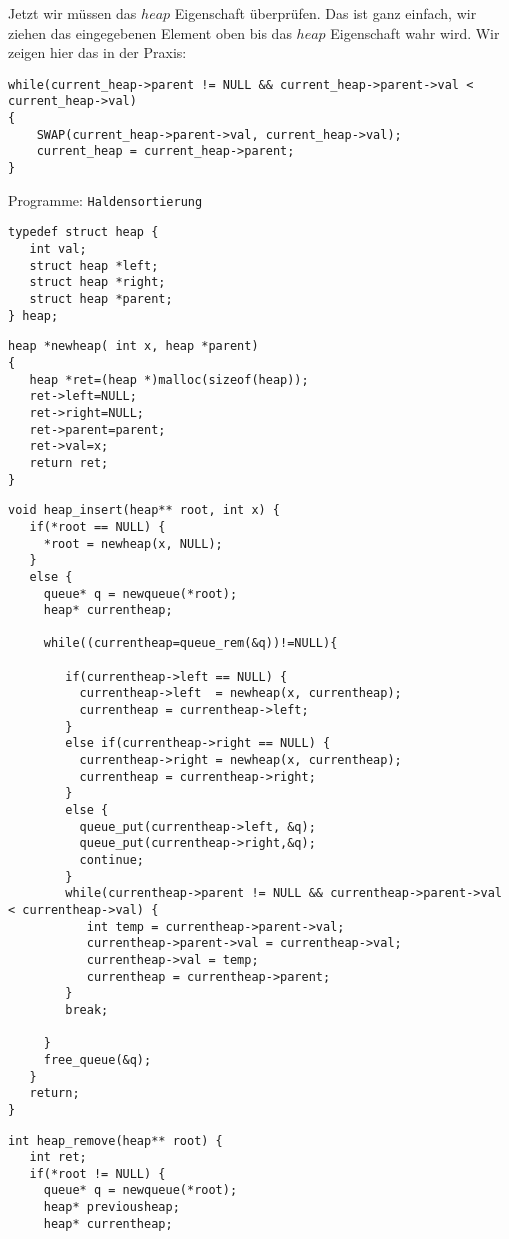 Jetzt wir müssen das $heap$ Eigenschaft überprüfen. Das ist ganz einfach, 
wir ziehen das eingegebenen Element oben bis das $heap$ Eigenschaft wahr wird.
Wir zeigen hier das in der Praxis:
\begin{lstlisting}
while(current_heap->parent != NULL && current_heap->parent->val < current_heap->val) 
{
    SWAP(current_heap->parent->val, current_heap->val);
    current_heap = current_heap->parent;
}
\end{lstlisting} 

\begin{myexampleprogram}{Programme: \texttt{Haldensortierung}}
\begin{lstlisting}
typedef struct heap {
   int val;
   struct heap *left;
   struct heap *right;
   struct heap *parent;
} heap;
\end{lstlisting}
\begin{lstlisting}
heap *newheap( int x, heap *parent)
{
   heap *ret=(heap *)malloc(sizeof(heap));
   ret->left=NULL;
   ret->right=NULL;
   ret->parent=parent;
   ret->val=x;
   return ret;
}
\end{lstlisting}
\begin{lstlisting}
void heap_insert(heap** root, int x) {
   if(*root == NULL) {
     *root = newheap(x, NULL);
   }
   else {
     queue* q = newqueue(*root);
     heap* currentheap;

     while((currentheap=queue_rem(&q))!=NULL){

        if(currentheap->left == NULL) {
          currentheap->left  = newheap(x, currentheap);
          currentheap = currentheap->left;
        }
        else if(currentheap->right == NULL) {
          currentheap->right = newheap(x, currentheap);
          currentheap = currentheap->right;
        }
        else {
          queue_put(currentheap->left, &q);
          queue_put(currentheap->right,&q);
          continue;
        }
        while(currentheap->parent != NULL && currentheap->parent->val < currentheap->val) {
           int temp = currentheap->parent->val;
           currentheap->parent->val = currentheap->val;
           currentheap->val = temp;
           currentheap = currentheap->parent;
        }
        break;

     }
     free_queue(&q);
   }
   return;
}
\end{lstlisting}
\begin{lstlisting}
int heap_remove(heap** root) {
   int ret;
   if(*root != NULL) {
     queue* q = newqueue(*root);
     heap* previousheap;
     heap* currentheap;


\end{lstlisting}
\end{myexampleprogram}
